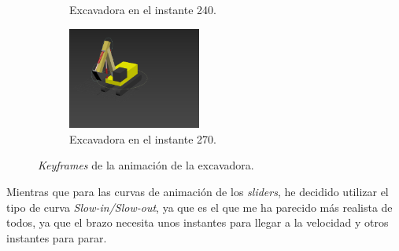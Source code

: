 \begin{figure}[H]
\begin{subfigure}[t]{0.48\textwidth}
    \caption{Excavadora en el instante 240.}
\end{subfigure}
\par\bigskip
\begin{subfigure}[t]{\textwidth}
    \centering
    \includegraphics[width=0.48\textwidth]{imagenes/animacion/270.png}
    \caption{Excavadora en el instante 270.}
\end{subfigure}        
\caption{\textit{Keyframes} de la animación de la excavadora.}        
\end{figure}

Mientras que para las curvas de animación de los \textit{sliders}, he decidido utilizar el tipo de curva \textit{Slow-in/Slow-out}, ya que es el que me ha parecido más realista de todos, ya que el brazo necesita unos instantes para llegar a la velocidad y otros instantes para parar.
